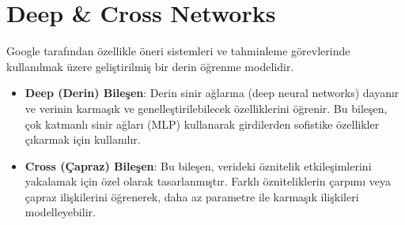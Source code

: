 \section{Deep \& Cross Networks}

Google tarafından özellikle öneri sistemleri ve tahminleme görevlerinde kullanılmak üzere geliştirilmiş bir derin öğrenme modelidir. 

\begin{itemize}
    \item \textbf{Deep (Derin) Bileşen}: Derin sinir ağlarına (deep neural networks) dayanır ve verinin karmaşık ve genelleştirilebilecek özelliklerini öğrenir. Bu bileşen, çok katmanlı sinir ağları (MLP) kullanarak girdilerden sofistike özellikler çıkarmak için kullanılır.
    \item \textbf{Cross (Çapraz) Bileşen}: Bu bileşen, verideki öznitelik etkileşimlerini yakalamak için özel olarak tasarlanmıştır. Farklı özniteliklerin çarpımı veya çapraz ilişkilerini öğrenerek, daha az parametre ile karmaşık ilişkileri modelleyebilir.
\end{itemize}

\newpage